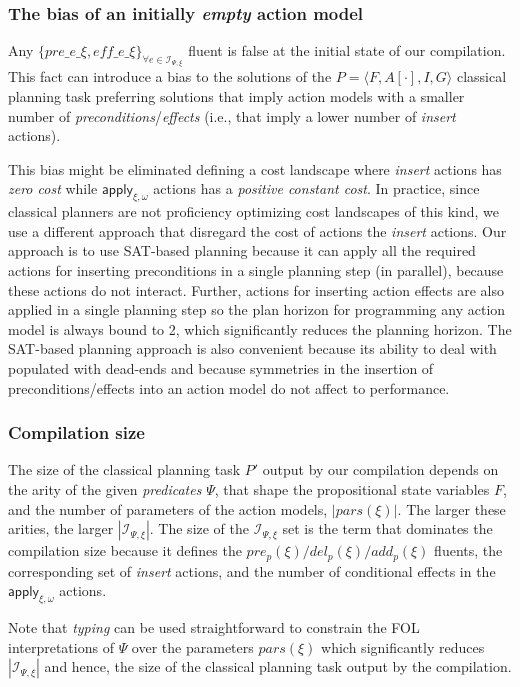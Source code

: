 \documentclass{article}
\newcommand{\tup}[1]{{\langle #1 \rangle}}
\begin{document}
\subsubsection{The bias of an initially {\em empty} action model}
Any $\{pre\_e\_\xi, eff\_e\_\xi\}_{\forall e\in{\mathcal I}_{\Psi,\xi}}$ fluent is false at the initial state of our compilation. This fact can introduce a bias to the solutions of the $P=\tup{F,A[\cdot],I,G}$ classical planning task preferring solutions that imply action models with a smaller number of {\em preconditions}/{\em effects} (i.e., that imply a lower number of {\em insert} actions).

This bias might be eliminated defining a cost landscape where {\em insert} actions has {\em zero cost} while $\mathsf{apply_{\xi,\omega}}$ actions has a {\em positive constant cost}. In practice, since classical planners are not proficiency optimizing cost landscapes of this kind, we use a different approach that disregard the cost of actions the {\em insert} actions. Our approach is to use SAT-based planning because it can apply all the required actions for inserting preconditions in a single planning step (in parallel), because these actions do not interact. Further, actions for inserting action effects are also applied in a single planning step so the plan horizon for programming any action model is always bound to 2, which significantly reduces the planning horizon. The SAT-based planning approach is also convenient because its ability to deal with populated with dead-ends and because symmetries in the insertion of preconditions/effects into an action model do not affect to performance.

\subsubsection{Compilation size}
The size of the classical planning task $P'$ output by our compilation depends on the arity of the given {\em predicates} $\Psi$, that shape the propositional state variables $F$, and the number of parameters of the action models, $|pars(\xi)|$. The larger these arities, the larger $|{\mathcal I}_{\Psi,\xi}|$. The size of the ${\mathcal I}_{\Psi,\xi}$ set is the term that dominates the compilation size because it defines the $pre_p(\xi)/del_p(\xi)/add_p(\xi)$ fluents, the corresponding set of {\em insert} actions, and the number of conditional effects in the $\mathsf{apply_{\xi,\omega}}$ actions.

Note that {\em typing} can be used straightforward to constrain the FOL interpretations of $\Psi$ over the parameters $pars(\xi)$ which significantly reduces $|{\mathcal I}_{\Psi,\xi}|$ and hence, the size of the classical planning task output by the compilation.
\end{document}
